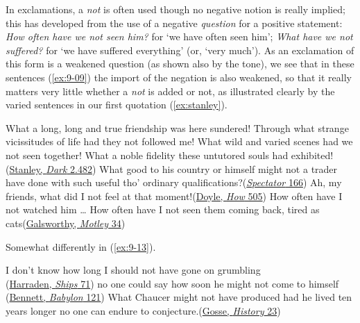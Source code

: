 In exclamations, a \textit{not} is often used though no negative notion is really implied; this has developed from the use of a negative \emph{question} for a positive statement: \textit{How often have we not seen him?} for `we have often seen him'; \textit{What have we not suffered?} for `we have suffered everything' (or, `very much'). As an exclamation of this form is a weakened question (as shown also by the tone), we see that in these sentences (\ref{ex:9-09}) the import of the negation is also weakened, so that it really matters very little whether a \textit{not} is added or not, as illustrated clearly by the varied sentences in our first quotation (\ref{ex:stanley}).

\ea \label{ex:9-09}
\ea \label{ex:stanley}
What a long, long and true friendship was here sundered! Through what strange vicissitudes of life had they not followed me! What wild and varied scenes had we not seen together! What a noble fidelity these untutored souls had exhibited!\hfill(\href{https://archive.org/details/throughdarkconti1878stan2/page/482/mode/2up?q=%22what+a+long%22&view=theater}{Stanley, \textit{Dark} 2.482})
\ex What good to his country or himself might not a trader have done with such useful tho' ordinary qualifications?\hfill(\href{https://archive.org/details/spectatornewedre00addiuoft/page/166/mode/2up?q=%22what+good+to+his+country%22&view=theater}{\textit{Spectator} 166}) %
\ex Ah, my friends, what did I not feel at that moment!\hfill(\href{https://archive.org/details/TheStrandMagazineAnIllustratedMonthly/TheStrandMagazine1895aVol.IxJan-jun/page/n517/mode/2up?q=%22what+did+I+not%22&view=theater}{Doyle, \textit{How} 505}) %
\ex How often have I not watched him {\dots}  How often have I not seen them coming back, tired as cats\hfill(\href{https://archive.org/details/motleyxx00gals/page/22/mode/2up?q=%22how+often+have+i+not%22&view=theater}{Galsworthy, \textit{Motley} 34})
\z
\z

Somewhat differently in (\ref{ex:9-13}).

\ea \label{ex:9-13}
\ea I don't know how long I should not have gone on grumbling\\\hfill(\href{https://archive.org/details/shipsthatpassin00harr/page/128/mode/2up?view=theater&q=%22I+don%27t+know+how+long%22}{Harraden, \textit{Ships} 71})
\ex no one could say how soon he might not come to himself\\\hfill(\href{https://archive.org/details/grandbabylonhote00bennuoft/page/158/mode/2up?q=%22No+one+could+say%22&view=theater}{Bennett, \textit{Babylon} 121})
\ex What Chaucer might not have produced had he lived ten years longer no one can endure to conjecture.\hfill(\href{https://archive.org/details/in.ernet.dli.2015.513623/page/23/mode/2up?view=theater}{Gosse, \textit{History} 23})%
\z
\z

